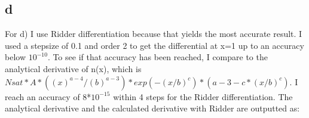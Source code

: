 \subsection*{d}

For d) I use Ridder differentiation because that yields the most accurate result. I used a stepsize of 0.1
and order 2 to get the differential at x=1 up to an accuracy below $10^{-10}$. To see if that accuracy has been
reached, I compare to the analytical derivative of n(x), which is 
$Nsat* A*((x)^{a-4}/(b)^{a-3})*exp(-(x/b)^c)*(a-3-c*(x/b)^c)$.
I reach an accuracy of 8*$10^{-15}$ within 4 steps for the Ridder differentiation.
The analytical derivative and the calculated derivative with Ridder are outputted as:



